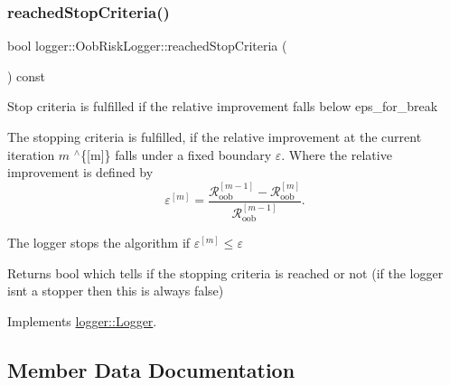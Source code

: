 \mbox{\label{classlogger_1_1_oob_risk_logger_a5c1c8358ffcb5f5463b43f068ea21aa4}} 
\subsubsection{\texorpdfstring{reached\+Stop\+Criteria()}{reachedStopCriteria()}}
{\footnotesize\ttfamily bool logger\+::\+Oob\+Risk\+Logger\+::reached\+Stop\+Criteria (\begin{DoxyParamCaption}{ }\end{DoxyParamCaption}) const\hspace{0.3cm}{\ttfamily [virtual]}}



Stop criteria is fulfilled if the relative improvement falls below {\ttfamily eps\+\_\+for\+\_\+break} 

The stopping criteria is fulfilled, if the relative improvement at the current iteration $m$ $^\wedge$\{\mbox{[}m\mbox{]}\} falls under a fixed boundary $\varepsilon$. Where the relative improvement is defined by \[ \varepsilon^{[m]} = \frac{\mathcal{R}_\mathrm{oob}^{[m-1]} - \mathcal{R}_\mathrm{oob}^{[m]}}{\mathcal{R}_\mathrm{oob}^{[m-1]}}. \]

The logger stops the algorithm if $\varepsilon^{[m]} \leq \varepsilon$

\begin{DoxyReturn}{Returns}
{\ttfamily bool} which tells if the stopping criteria is reached or not (if the logger isn\textquotesingle{}t a stopper then this is always false) 
\end{DoxyReturn}


Implements \mbox{\hyperlink{classlogger_1_1_logger_aed91421c07062b91cee158ef2bda7ae8}{logger\+::\+Logger}}.



\subsection{Member Data Documentation}
\mbox{\label{classlogger_1_1_oob_risk_logger_a6dccaf686895c4a3f9eb88a8f74e65fa}} 
